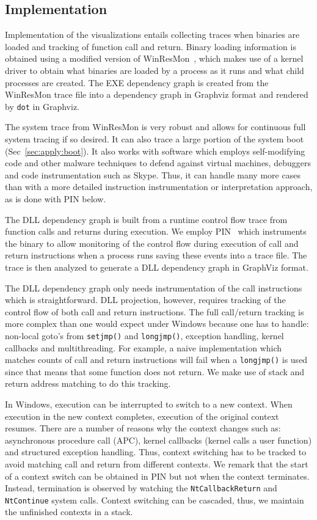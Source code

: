 \subsection{Implementation}

Implementation of the visualizations entails collecting tra\-ces when
binaries are loaded and tracking of function call and return.
Binary loading information is obtained using
a modified version of WinResMon~\cite{ramnath2006winresmon},
which makes use of a kernel driver to obtain
what binaries are loaded by a process as it runs and
what child processes are created.
The EXE dependency graph is created from
the WinResMon trace file into a dependency graph in
Graphviz \cite{ellson2002graphviz} format and rendered by {\tt dot} in Graphviz.

The system trace from WinResMon is very robust and allows for continuous
full system tracing if so desired.
It can also trace a large portion of the system boot (Sec~\ref{sec:apply:boot}).
It also works with software which employs self-modifying
code and other malware techniques to defend against virtual machines,
debuggers and code instrumentation such as Skype.
Thus, it can handle many more cases than with a more detailed
instruction instrumentation or interpretation approach, as is done
with PIN below.

The DLL dependency graph is built from a runtime control flow trace from
function calls and returns during execution.
We employ PIN~\cite{luk2005pin} which instruments the binary to allow monitoring
of the control flow during execution of call and return instructions
when a process runs saving these events into a trace file.
The trace is then analyzed to generate a DLL dependency graph in
GraphViz format.

The DLL dependency graph only needs instrumentation of the call instructions
which is straightforward.
DLL projection, however, requires tracking of the control flow of both
call and return instructions.
The full call/return tracking is more complex than one would expect
under Windows because one has to handle:
non-local goto's from {\tt setjmp()} and {\tt longjmp()}, exception handling,
kernel callbacks and multithreading.
For example, a naive implementation which matches counts of call and
return instructions will fail when a {\tt longjmp()} is used
since that means that some function does not return.
We make use of stack and return address matching to do this tracking.

In Windows, execution can be interrupted to switch to a new context.
When execution in the new context completes, execution of the original
context resumes.
There are a number of reasons why the context changes
such as: asynchronous procedure call (APC), kernel callbacks
(kernel calls a user function) and structured exception handling.
Thus, context switching has to be tracked to avoid matching
call and return from different contexts.
We remark that the start of a context switch can be obtained in PIN but
not when the context terminates.
Instead, termination is observed by watching the {\tt NtCallbackReturn}
and {\tt NtContinue} system calls.
Context switching can be cascaded, thus, we maintain the unfinished
contexts in a stack.

